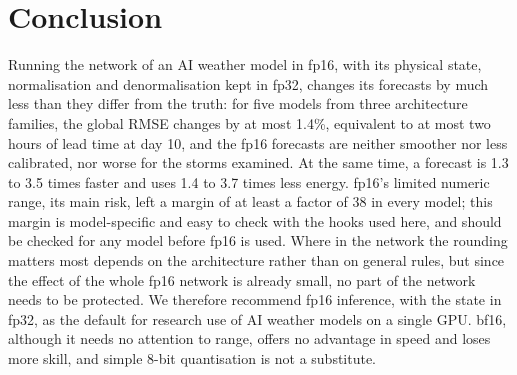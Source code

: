 \section{Conclusion}
\label{sec:conclusion}

Running the network of an AI weather model in fp16, with its
physical state, normalisation and denormalisation kept in fp32, changes
its forecasts by much less than they differ from the truth: for five
models from three architecture families, the global RMSE changes by at
most 1.4\%, equivalent to at most two hours of lead time at day 10, and
the fp16 forecasts are neither smoother nor less calibrated, nor worse
for the storms examined. At the same time, a forecast is 1.3 to 3.5
times faster and uses 1.4 to 3.7 times less energy.
fp16's limited numeric range, its main risk, left a margin of at least a factor
of 38 in every model; this margin is model-specific and easy to check
with the hooks used here, and should be checked for any model before
fp16 is used. Where in the network the rounding matters most depends on
the architecture rather than on general rules, but since the effect of
the whole fp16 network is already small, no part of the network needs
to be protected. We therefore recommend fp16 inference, with the state
in fp32, as the default for research use of AI weather models on a
single GPU. bf16, although it needs no attention to range, offers no
advantage in speed and loses more skill, and simple 8-bit quantisation
is not a substitute.
